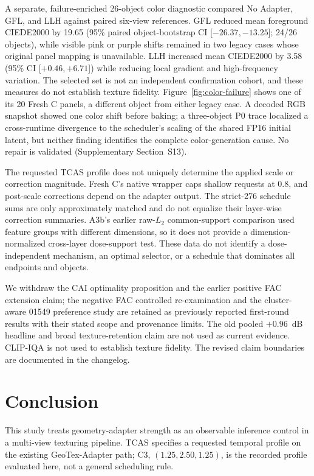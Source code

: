 \documentclass[times,twocolumn,final]{elsarticle}
\begin{document}
A separate, failure-enriched 26-object color diagnostic compared No Adapter, GFL, and LLH against paired six-view references. GFL reduced mean foreground CIEDE2000 by 19.65 (95\% paired object-bootstrap CI [$-26.37,-13.25$]; 24/26 objects), while visible pink or purple shifts remained in two legacy cases whose original panel mapping is unavailable. LLH increased mean CIEDE2000 by 3.58 (95\% CI [$+0.46,+6.71$]) while reducing local gradient and high-frequency variation. The selected set is not an independent confirmation cohort, and these measures do not establish texture fidelity. Figure~\ref{fig:color-failure} shows one of its 20 Fresh C panels, a different object from either legacy case. A decoded RGB snapshot showed one color shift before baking; a three-object P0 trace localized a cross-runtime divergence to the scheduler's scaling of the shared FP16 initial latent, but neither finding identifies the complete color-generation cause. No repair is validated (Supplementary Section~S13).

The requested TCAS profile does not uniquely determine the applied scale or correction magnitude. Fresh C's native wrapper caps shallow requests at 0.8, and post-scale corrections depend on the adapter output. The strict-276 schedule sums are only approximately matched and do not equalize their layer-wise correction summaries. A3b's earlier raw-$L_2$ common-support comparison used feature groups with different dimensions, so it does not provide a dimension-normalized cross-layer dose-support test. These data do not identify a dose-independent mechanism, an optimal selector, or a schedule that dominates all endpoints and objects.

We withdraw the CAI optimality proposition and the earlier positive FAC extension claim; the negative FAC controlled re-examination and the cluster-aware 01549 preference study are retained as previously reported first-round results with their stated scope and provenance limits. The old pooled $+0.96$~dB headline and broad texture-retention claim are not used as current evidence. CLIP-IQA is not used to establish texture fidelity. The revised claim boundaries are documented in the changelog.

\section{Conclusion}
\label{sec:conclusion}

This study treats geometry-adapter strength as an observable inference control in a multi-view texturing pipeline. TCAS specifies a requested temporal profile on the existing GeoTex-Adapter path; C3, $(1.25,2.50,1.25)$, is the recorded profile evaluated here, not a general scheduling rule.
\end{document}
